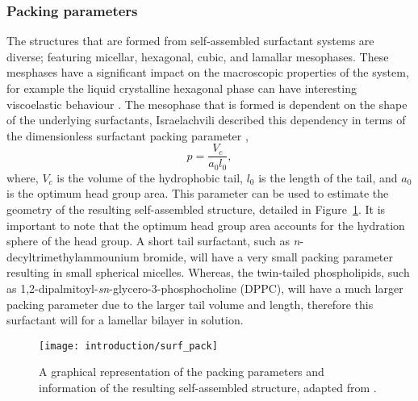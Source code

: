 \subsubsection{Packing parameters}

The structures that are formed from self-assembled surfactant systems are diverse; featuring micellar, hexagonal, cubic, and lamallar mesophases.
These mesphases have a significant impact on the macroscopic properties of the system, for example the liquid crystalline hexagonal phase can have interesting viscoelastic behaviour \cite{jurasin_lamellar_2013,cordobes_linear_1997}.
The mesophase that is formed is dependent on the shape of the underlying surfactants, Israelachvili described this dependency in terms of the dimensionless surfactant packing parameter \cite{israelachvili_intermolecular_2011},
%
\begin{equation}
p = \frac{V_c}{a_0l_0},
\end{equation}
%
where, $V_c$ is the volume of the hydrophobic tail, $l_0$ is the length of the tail, and $a_0$ is the optimum head group area.
This parameter can be used to estimate the geometry of the resulting self-assembled structure, detailed in Figure~\ref{fig:pack}.
It is important to note that the optimum head group area accounts for the hydration sphere of the head group.
A short tail surfactant, such as \emph{n}-decyltrimethylammounium bromide, will have a very small packing parameter resulting in small spherical micelles.
Whereas, the twin-tailed phospholipids, such as 1,2-dipalmitoyl-\emph{sn}-glycero-3-phosphocholine (DPPC), will have a much larger packing parameter due to the larger tail volume and length, therefore this surfactant will for a lamellar bilayer in solution. 
%
\begin{figure}
    \centering
    \texttt{[image: introduction/surf\_pack]}
    \caption{A graphical representation of the packing parameters and information of the resulting self-assembled structure, adapted from \cite{israelachvili_intermolecular_2011}.}
    \label{fig:pack}
\end{figure}
%
